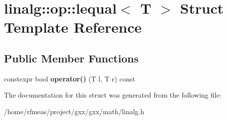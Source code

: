 \hypertarget{structlinalg_1_1op_1_1lequal}{}\section{linalg\+:\+:op\+:\+:lequal$<$ T $>$ Struct Template Reference}
\label{structlinalg_1_1op_1_1lequal}
\subsection*{Public Member Functions}
\begin{DoxyCompactItemize}
\item 
constexpr bool {\bfseries operator()} (T l, T r) const \hypertarget{structlinalg_1_1op_1_1lequal_a7114b5779af5e164c7b9082c6c781632}{}\label{structlinalg_1_1op_1_1lequal_a7114b5779af5e164c7b9082c6c781632}

\end{DoxyCompactItemize}


The documentation for this struct was generated from the following file\+:\begin{DoxyCompactItemize}
\item 
/home/rfmeas/project/gxx/gxx/math/linalg.\+h\end{DoxyCompactItemize}

